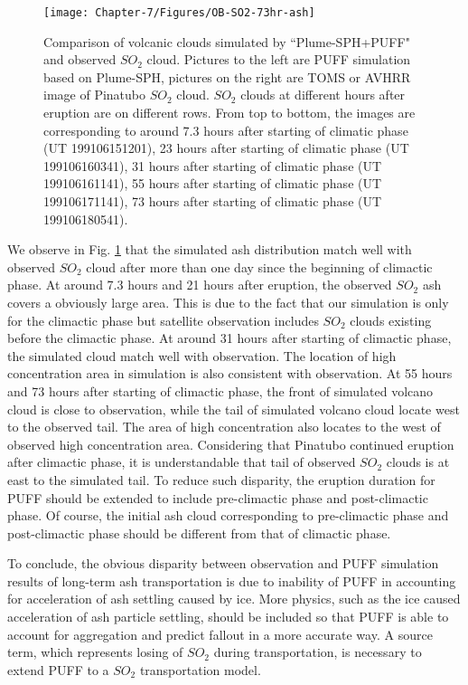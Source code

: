 \begin{figure}[!htb]
\begin{minipage}{.325\textwidth}
    \end{minipage}%
    \begin{minipage}{.325 \textwidth}
        \centering
        \texttt{[image: Chapter-7/Figures/OB-SO2-73hr-ash]}
    \end{minipage}%
    \caption{Comparison of volcanic clouds simulated by ``Plume-SPH+PUFF" and observed $SO_2$ cloud. Pictures to the left are PUFF simulation based on Plume-SPH, pictures on the right are TOMS or AVHRR image of Pinatubo $SO_2$ cloud. $SO_2$ clouds at different hours after eruption are on different rows. From top to bottom, the images are corresponding to around 7.3 hours after starting of climatic phase (UT 199106151201), 23 hours after starting of climatic phase (UT 199106160341), 31 hours after starting of climatic phase (UT 199106161141), 55 hours after starting of climatic phase (UT 199106171141), 73 hours after starting of climatic phase (UT 199106180541).}
    \label{fig:Plume-SPH-Pinatubo-SO2-cloud}
\end{figure}

We observe in Fig. \ref{fig:Plume-SPH-Pinatubo-SO2-cloud} that the simulated ash distribution match well with observed $SO_2$ cloud after more than one day since the beginning of climactic phase. At around 7.3 hours and 21 hours after eruption, the observed $SO_2$ ash covers a obviously large area. This is due to the fact that our simulation is only for the climactic phase but satellite observation includes $SO_2$ clouds existing before the climactic phase. At around 31 hours after starting of climactic phase, the simulated cloud match well with observation. The location of high concentration area in simulation is also consistent with observation. At 55 hours and 73 hours after starting of climactic phase, the front of simulated volcano cloud is close to observation, while the tail of simulated volcano cloud locate west to the observed tail. The area of high concentration also locates to the west of observed high concentration area. Considering that Pinatubo continued eruption after climactic phase, it is understandable that tail of observed $SO_2$ clouds is at east to the simulated tail. To reduce such disparity, the eruption duration for PUFF should be extended to include pre-climactic phase and post-climactic phase. Of course, the initial ash cloud corresponding to pre-climactic phase and post-climactic phase should be different from that of climactic phase.

To conclude, the obvious disparity between observation and PUFF simulation results of long-term ash transportation is due to inability of PUFF in accounting for acceleration of ash settling caused by ice. More physics, such as the ice caused acceleration of ash particle settling, should be included so that PUFF is able to account for aggregation and predict fallout in a more accurate way. A source term, which represents losing of $SO_2$ during transportation, is necessary to extend PUFF to a $SO_2$ transportation model.

